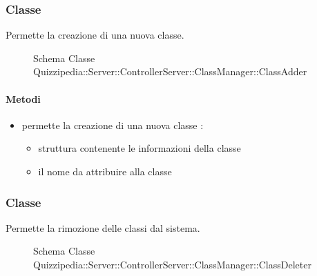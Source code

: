 \subsubsection{Classe }
Permette la creazione di una nuova classe.
\begin{figure}[H]
\centering
\noindent{}
\caption[Schema Classe ClassAdder]{Schema Classe Quizzipedia::Server::ControllerServer::ClassManager::ClassAdder}
\end{figure}
\paragraph{Metodi}
\begin{itemize}
\item {}
\newline
permette la creazione di una nuova classe
\newline
{} :
\begin{itemize}
\item {}
\newline
struttura contenente le informazioni della classe
\item {}
\newline
il nome da attribuire alla classe
\end{itemize}
\end{itemize}
\subsubsection{Classe }
Permette la rimozione delle classi dal sistema.
\begin{figure}[H]
\centering
\noindent{}
\caption[Schema Classe ClassDeleter]{Schema Classe Quizzipedia::Server::ControllerServer::ClassManager::ClassDeleter}
\end{figure}

